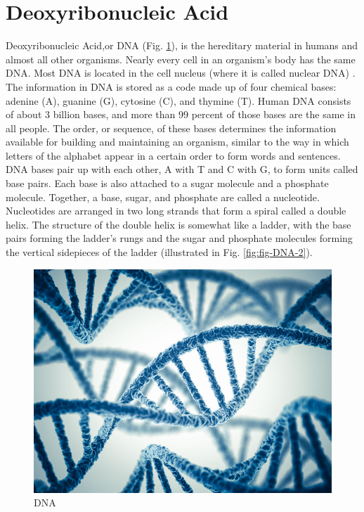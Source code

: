 \documentclass[12pt]{llncs}
\begin{document}
\section{Deoxyribonucleic Acid}
Deoxyribonucleic Acid,or DNA  (Fig. \ref{fig:fig-DNA-1}), is the hereditary material in humans and almost all other organisms. Nearly every cell in an organism’s body has the same DNA. Most DNA is located in the cell nucleus (where it is called nuclear DNA) \cite{DNA1,DNA2}.
The information in DNA is stored as a code made up of four chemical bases: adenine (A), guanine (G), cytosine (C), and thymine (T). Human DNA consists of about 3 billion bases, and more than 99 percent of those bases are the same in all people. The order, or sequence, of these bases determines the information available for building and maintaining an organism, similar to the way in which letters of the alphabet appear in a certain order to form words and sentences.
DNA bases pair up with each other, A with T and C with G, to form units called base pairs. Each base is also attached to a sugar molecule and a phosphate molecule. Together, a base, sugar, and phosphate are called a nucleotide. Nucleotides are arranged in two long strands that form a spiral called a double helix. The structure of the double helix is somewhat like a ladder, with the base pairs forming the ladder’s rungs and the sugar and phosphate molecules forming the vertical sidepieces of the ladder (illustrated in Fig. \ref{fig:fig-DNA-2}).

\begin{figure}
	\centering
	\includegraphics{./figs/DNA-1}
    \caption{\label{fig:fig-DNA-1}DNA}
\end{figure}
\end{document}
